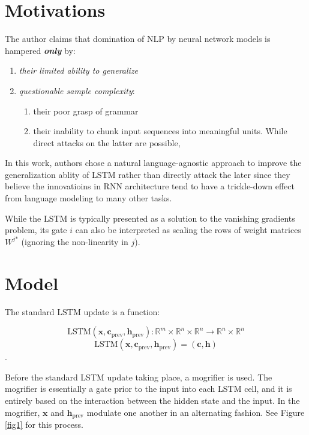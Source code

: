 \section{Motivations}

The author claims that domination of NLP by neural network models is hampered \textbf{\textit{only}} by:
\begin{enumerate}
  \item \textit{their limited ability to generalize}
  \item \textit{questionable sample complexity}:
    \begin{enumerate}
      \item their poor grasp of grammar
      \item their inability to chunk input sequences into meaningful units. While
      direct attacks on the latter are possible,
    \end{enumerate}
\end{enumerate}

In this work, authors chose a natural language-agnostic approach to improve
the generalization ablity of LSTM rather than directly attack the later since
they believe the innovatioins in RNN architecture tend to have a trickle-down
effect from language modeling to many other tasks.

While the LSTM is typically presented as a solution to the vanishing gradients
problem, its gate $i$ can also be interpreted as scaling the rows of weight matrices
$W^{j\text{*}}$ (ignoring the non-linearity in $j$).

\section{Model}

The standard LSTM update is a function:

$$\text{LSTM}(\boldsymbol{x}, \boldsymbol{c}_{\text{prev}}, \boldsymbol{h}_{\text{prev}}):
\mathbb{R}^m \times \mathbb{R}^n \times \mathbb{R}^n \rightarrow \mathbb{R}^n \times \mathbb{R}^n$$
$$\text{LSTM}(\boldsymbol{x}, \boldsymbol{c}_{\text{prev}}, \boldsymbol{h}_{\text{prev}})
= (\boldsymbol{c}, \boldsymbol{h})$$.

Before the standard LSTM update taking place, a mogrifier is used. The mogrifier
is essentially a gate prior to the input into each LSTM cell, and it is entirely
based on the interaction between the hidden state and the input. In the mogrifier,
$\boldsymbol{x}$ and $\boldsymbol{h}_{\text{prev}}$ modulate one another in an alternating
fashion. See Figure \ref{fig1} for this process.

